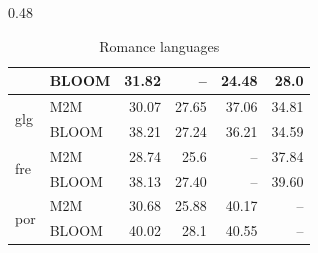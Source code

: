 \begin{table}[!ht]
\begin{subtable}[t]{0.48\textwidth}
{\begin{tabular}{llrrrr}
    & BLOOM & 31.82 & -- & 24.48 & 28.0  \\
    \midrule
    \multirow{2}{*}{glg}
    & M2M & 30.07 & 27.65 & 37.06 & 34.81 \\
    & BLOOM & 38.21 & 27.24 & 36.21 & 34.59  \\
    \midrule
    \multirow{2}{*}{fre}
    & M2M & 28.74 & 25.6 & -- & 37.84 \\
    & BLOOM & 38.13 & 27.40 & -- & 39.60 \\
    \midrule
    \multirow{2}{*}{por}
    & M2M & 30.68 & 25.88 & 40.17 & --  \\
    & BLOOM &  40.02 & 28.1 & 40.55 & -- \\
    \bottomrule
  \end{tabular}}
\caption{Romance languages}
\label{tab:flores101_summary:same-fami}
\end{subtable}

\vspace{1em}


\end{table}
